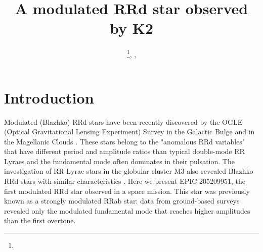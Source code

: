 \documentclass[epj,twocolumn]{webofc}
\begin{document}
\title{A modulated RRd star observed by K2}
%

\author{ \fnsep\thanks{}, 
         ,
          \and
          
}



%
\maketitle
%
\section{Introduction}
\label{intro}

Modulated (Blazhko) RRd stars have been recently discovered by the OGLE (Optical Gravitational Lensing Experiment) Survey in the Galactic Bulge \cite{ogle,smolec} and in the Magellanic Clouds \cite{anomal}. These stars belong to the "anomalous RRd variables" that have different period and amplitude ratios than typical double-mode RR Lyraes and the fundamental mode often dominates in their pulsation. The investigation of RR Lyrae stars in the globular cluster M3 also revealed Blazhko RRd stars with similar characteristics \cite{jurcsik}. Here we present EPIC 205209951, the first modulated RRd star observed in a space mission. This star was previously known as a strongly modulated RRab star: data from ground-based surveys revealed only the modulated fundamental mode that reaches higher amplitudes than the first overtone.


\end{document}
